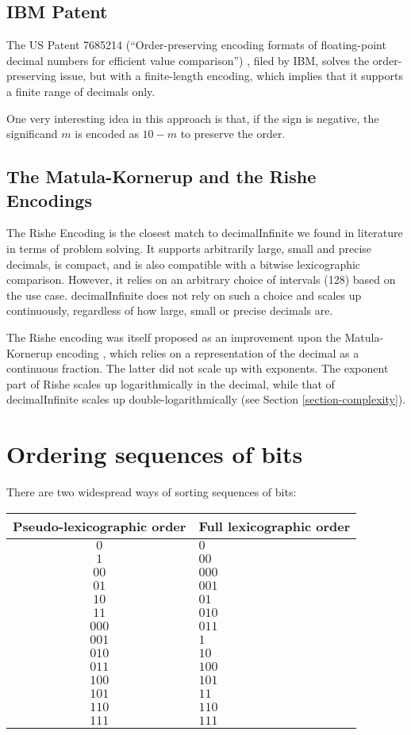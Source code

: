 \documentclass[final,leqno,onefignum,onetabnum]{siamltex1213}
\begin{document}
\subsection{IBM Patent}
The US Patent 7685214 (``Order-preserving encoding formats of floating-point decimal numbers for efficient value comparison'') , filed by IBM, solves the order-preserving issue, but with a finite-length encoding, which implies that it supports a finite range of decimals only.

One very interesting idea in this approach is that, if the sign is negative, the significand $m$ is encoded as $10-m$ to preserve the order.

\subsection{The Matula-Kornerup and the Rishe Encodings}
\label{section-rishe}

The Rishe Encoding \cite{Rishe1992} is the closest match to decimalInfinite we found in literature in terms of problem solving. It supports arbitrarily large, small and precise decimals, is compact, and is also compatible with a bitwise lexicographic comparison. However, it relies on an arbitrary choice of intervals (128) based on the use case. decimalInfinite does not rely on such a choice and scales up continuously, regardless of how large, small or precise decimals are.

The Rishe encoding was itself proposed as an improvement upon the Matula-Kornerup encoding \cite{Kornerup1983}, which relies on a representation of the decimal as a continuous fraction. The latter did not scale up with exponents. The exponent part of Rishe scales up logarithmically in the decimal, while that of decimalInfinite scales up double-logarithmically (see Section \ref{section-complexity}).

\section{Ordering sequences of bits}
\label{section-ordering}

There are two widespread ways of sorting sequences of bits:


\begin{tabular}{|c|l|}
\hline
Pseudo-lexicographic order & Full lexicographic order\\
\hline
$0$ & $0$ \\
$1$ & $00$ \\
$00$ & $000$ \\
$01$ & $001$ \\
$10$ & $01$ \\
$11$ & $010$ \\
$000$ & $011$ \\
$001$ & $1$ \\
$010$ & $10$ \\
$011$ & $100$ \\
$100$ & $101$ \\
$101$ & $11$ \\
$110$ & $110$ \\
$111$ & $111$ \\
\hline
\end{tabular}
\end{document}
